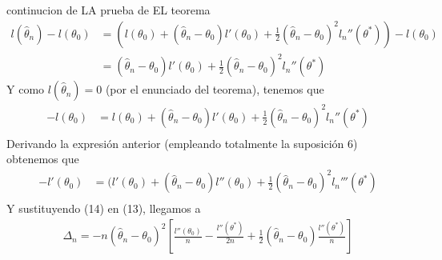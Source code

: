 \documentclass{beamer}
\begin{document}
\begin{frame}{continucion de LA prueba de EL teorema}
\begin{equation}
\begin{split}
l(\hat{\theta}_n) -l({\theta}_0) &=
( l(\theta_0) +(\hat{\theta}_n - \theta_0)l'(\theta_0) + \frac{1}{2}(\hat{\theta}_n - \theta_0)^2l_n''(\theta^*) )-l({\theta}_0)\\
& = (\hat{\theta}_n - \theta_0)l'(\theta_0) + \frac{1}{2}(\hat{\theta}_n - \theta_0)^2l_n''(\theta^*)
\end{split}
\end{equation}
Y como $l(\hat{\theta}_n) = 0$ (por el enunciado del teorema), tenemos que 
\begin{equation*}
\begin{split}
-l({\theta}_0) &=
 l(\theta_0) +(\hat{\theta}_n - \theta_0)l'(\theta_0) + \frac{1}{2}(\hat{\theta}_n - \theta_0)^2l_n''(\theta^*) \\
\end{split}
\end{equation*}
Derivando la expresión anterior (empleando totalmente la suposición 6) obtenemos que 
\begin{equation}
\begin{split}
-l'({\theta}_0) &=
( l'(\theta_0) +(\hat{\theta}_n - \theta_0)l''(\theta_0) + \frac{1}{2}(\hat{\theta}_n - \theta_0)^2l_n'''(\theta^*) \\
\end{split}
\end{equation}
Y sustituyendo (14) en (13), llegamos a 
\begin{equation}
\begin{split}
\Delta_n = -n(\hat{\theta}_n - \theta_0)^2
\left[\frac{l''(\theta_0)}{n} - \frac{l''(\theta^*)}{2n} + \frac{1}{2}(\hat{\theta}_n - \theta_0) \frac{l''(\theta^*)}{n} \right]\\
\end{split}
\end{equation}
\end{frame}
\end{document}
